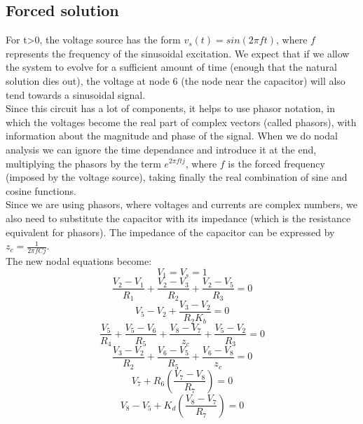 \subsection{Forced solution}
For t>0, the voltage source has the form $v_s(t)=sin(2 \pi  f t)$, where $f$ represents the frequency of the sinusoidal excitation. We expect that if we allow the system to evolve for a sufficient amount of time (enough that the natural solution dies out), the voltage at node 6 (the node near the capacitor) will also tend towards a sinusoidal signal. \\
Since this circuit has a lot of components, it helps to use phasor notation, in which the voltages become the real part of complex vectors (called phasors), with information about the magnitude and phase of the signal. When we do nodal analysis we can ignore the time dependance and introduce it at the end, multiplying the phasors by the term $e^{2 \pi f t j}$, where $f$ is the forced frequency (imposed by the voltage source), taking finally the real combination of sine and cosine functions. \\
Since we are using phasors, where voltages and currents are complex numbers, we also need to substitute the capacitor with its impedance (which is the resistance equivalent for phasors). The impedance of the capacitor can be expressed by $z_{c}=\frac{1}{2 \pi f C j}$. \\
The new nodal equations become: \\
\begin{equation}
    V_{1}=V_{s}=1
\end{equation}
\begin{equation}
  \frac{V_{2}-V_{1}}{R_{1}} +\frac{V_{2}-V_{3}}{R_{2}}+\frac{V_{2}-V_{5}}{R_{3}}=0 
\end{equation}
\begin{equation}
  V_{5}-V_{2}+\frac{V_{3}-V_{2}}{R_{2} K_b}=0
\end{equation}
\begin{equation}
   \frac{V_{5}}{R_{4}} + \frac{V_{5}-V_{6}}{R_{5}}+ \frac{V_{8}-V_{7}}{z_c} + \frac{V_{5}-V_{2}}{R_{3}}=0 
\end{equation}
\begin{equation}
    \frac{V_{3}- V_{2}}{R_{2}} + \frac{V_{6}-V_{5}}{R_{5}} + \frac{V_{6}-V_{8}}{z_c} = 0
\end{equation}
\begin{equation}
    V_{7}+ R_6 \left(\frac{V_{7}-V_{8}}{R_{7}}\right) = 0
\end{equation}
\begin{equation}
  V_{8}-V_{5} + K_d \left(\frac{V_{8}-V_{7}}{R_{7}}\right) = 0
\end{equation}
